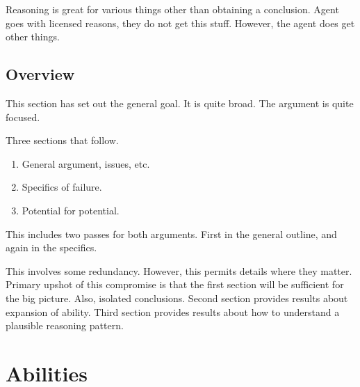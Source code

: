 \documentclass[10pt]{article}
\begin{document}
Reasoning is great for various things other than obtaining a conclusion.
Agent goes with licensed reasons, they do not get this stuff.
However, the agent does get other things.

\subsection{Overview}
\label{sec:overview}

This section has set out the general goal.
It is quite broad.
The argument is quite focused.

Three sections that follow.
\begin{enumerate}
\item General argument, issues, etc.
\item Specifics of failure.
\item Potential for potential.
\end{enumerate}
This includes two passes for both arguments.
First in the general outline, and again in the specifics.

This involves some redundancy.
However, this permits details where they matter.
Primary upshot of this compromise is that the first section will be sufficient for the big picture.
Also, isolated conclusions.
Second section provides results about expansion of ability.
Third section provides results about how to understand a plausible reasoning pattern.

\section{Abilities}
\label{sec:abilities}
\end{document}
